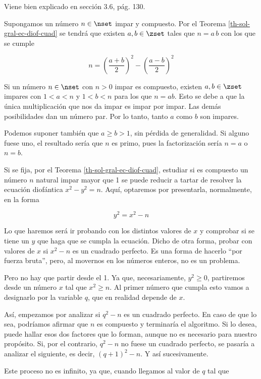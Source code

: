 

Viene bien explicado en \cite{rosen} sección 3.6, pág. 130.

Supongamos un número $n \in \nset$ impar y compuesto. Por el Teorema
\ref{th-sol-gral-ec-diof-cuad} se tendrá que existen $a, b \in \zset$ tales
que $n = a \, b$ con los que se cumple

$$ n = \left( \frac{a + b}{2} \right)^2 - \left( \frac{a - b}{2} \right)^2
$$






Si un número $n \in \nset$ con $n > 0$ impar es compuesto, existen $a, b \in
\zset$ impares con $1 < a < n$ y $1 < b < n$ para los que $n = ab$. Esto se
debe a que la única multiplicación que nos da impar es impar por impar. Las
demás posibilidades dan un número par. Por lo tanto, tanto $a$ como $b$ son
impares.

Podemos suponer también que $a \geq b > 1$, sin pérdida de generalidad. Si
alguno fuese uno, el resultado sería que $n$ es primo, pues la factorización
sería $n = a$ o $n = b$.

Si se fija, por el Teorema \ref{th-sol-gral-ec-diof-cuad}, estudiar si es
compuesto un número $n$ natural impar mayor que 1 se puede reducir a tartar
de resolver la ecuación diofántica $x^2 - y^2 = n$. Aquí, optaremos por
presentarla, normalmente, en la forma

$$ y^2 = x^2 - n $$

Lo que haremos será ir probando con los distintos valores de $x$ y comprobar
si se tiene un $y$ que haga que se cumpla la ecuación. Dicho de otra forma,
probar con valores de $x$ si $x^2 - n$ es un cuadrado perfecto. Es una forma
de hacerlo ``por fuerza bruta'', pero, al movernos en los números enteros,
no es un problema.

Pero no hay que partir desde el 1. Ya que, necesariamente, $y^2 \geq 0$,
partiremos desde un número $x$ tal que $x^2 \geq n$. Al primer número que
cumpla esto vamos a designarlo por la variable $q$, que en realidad depende
de $x$.

Así, empezamos por analizar si $q^2 - n$ es un cuadrado perfecto. En caso de
que lo sea, podríamos afirmar que $n$ es compuesto y terminaría el
algoritmo. Si lo desea, puede hallar esos dos factores que lo forman, aunque
no es necesario para nuestro propósito. Si, por el contrario, $q^2 - n$ no
fuese un cuadrado perfecto, se pasaría a analizar el siguiente, es decir,
$(q+1)^2 - n$. Y así sucesivamente.

Este proceso no es infinito, ya que, cuando llegamos al valor de $q$ tal que

